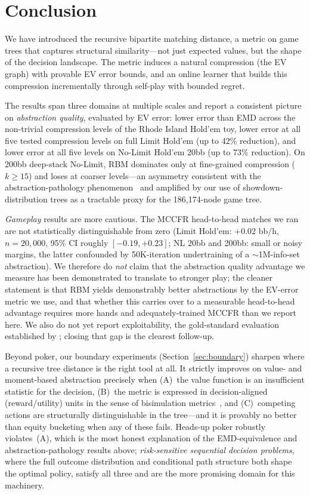 \documentclass[11pt]{article}
\begin{document}
\section{Conclusion}
\label{sec:conclusion}

We have introduced the recursive bipartite matching distance, a metric
on game trees that captures structural similarity---not just expected
values, but the shape of the decision landscape. The metric induces a
natural compression (the EV graph) with provable EV error bounds, and
an online learner that builds this compression incrementally through
self-play with bounded regret.

The results span three domains at multiple scales and report a
consistent picture on \emph{abstraction quality}, evaluated by EV
error: lower error than EMD across the non-trivial compression levels
of the Rhode Island Hold'em toy, lower error at all five tested
compression levels on full Limit Hold'em (up to 42\% reduction), and
lower error at all five levels on No-Limit Hold'em 20bb (up to 73\%
reduction). On 200bb deep-stack No-Limit, RBM dominates only at
fine-grained compression ($k \ge 15$) and loses at coarser
levels---an asymmetry consistent with the abstraction-pathology
phenomenon~\citep{waugh2009abstraction} and amplified by our use of
showdown-distribution trees as a tractable proxy for the
186{,}174-node game tree.

\emph{Gameplay} results are more cautious. The MCCFR head-to-head
matches we ran are not statistically distinguishable from zero (Limit
Hold'em: $+0.02$ bb/h, $n{=}20{,}000$, 95\% CI roughly $[-0.19,
+0.23]$; NL 20bb and 200bb: small or noisy margins, the latter
confounded by 50K-iteration undertraining of a ${\sim}$1M-info-set
abstraction). We therefore do \emph{not} claim that the abstraction
quality advantage we measure has been demonstrated to translate to
stronger play; the cleaner statement is that RBM yields demonstrably
better abstractions by the EV-error metric we use, and that whether
this carries over to a measurable head-to-head advantage requires more
hands and adequately-trained MCCFR than we report here. We also do
not yet report exploitability, the gold-standard evaluation
established by \citet{johanson2013evaluating}; closing that gap is the
clearest follow-up.

Beyond poker, our boundary experiments (Section~\ref{sec:boundary})
sharpen where a recursive tree distance is the right tool at all. It
strictly improves on value- and moment-based abstraction precisely when
(A)~the value function is an insufficient statistic for the decision,
(B)~the metric is expressed in decision-aligned (reward/utility) units
in the sense of bisimulation
metrics~\citep{ferns2004metrics,castro2020scalable}, and (C)~competing
actions are structurally distinguishable in the tree---and it is
provably no better than equity bucketing when any of these fails.
Heads-up poker robustly violates~(A), which is the most honest
explanation of the EMD-equivalence and abstraction-pathology results
above; \emph{risk-sensitive sequential decision problems}, where the
full outcome distribution and conditional path structure both shape the
optimal policy, satisfy all three and are the more promising domain for
this machinery.
\end{document}
